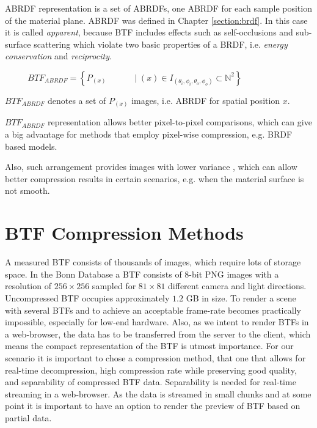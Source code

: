  ABRDF representation is a set of ABRDFs, one ABRDF for each sample position of the material plane. 
 ABRDF was defined in Chapter \ref{section:brdf}. In this case it is called \emph{apparent}, 
 because BTF includes effects such as self-occlusions and sub-surface scattering which violate two basic properties of a BRDF, i.e. \emph{energy conservation} and \emph{reciprocity}.
 
 {\centering $\,\,\,\,\,\,\,\,\,\,\,\,\,\,\,\,BTF_{ABRDF}=\left \{P_{(x) } \,\,\,\,\,\,\,\,\,\,\,\,\,\,\,\,\,\,\mid  (x)\in I_{(\theta_{i} ,\phi_{i},\theta_{o} ,\phi_{o})}\subset \mathbb{N}^{2}\right \}$ \\}
 
 $BTF_{ABRDF}$ denotes a set of $P_{(x)}$ images, i.e. ABRDF for spatial position $x$.


 $BTF_{ABRDF}$ representation allows better pixel-to-pixel comparisons, which can give a big advantage for methods that employ pixel-wise compression, e.g. BRDF based models.

Also, such arrangement provides images with lower variance \cite{haindl}, which can allow better compression results in certain scenarios, e.g. when the material surface is not smooth.

 
\section{BTF Compression Methods}
\label{chapter:compression_methods}



 A measured BTF consists of thousands of images, which require lots of storage space.
In the Bonn  Database \cite{btfBonn} a BTF consists of 8-bit PNG images with a resolution of $256\times256$ sampled for $81\times81$ different camera and light directions.
  Uncompressed BTF occupies approximately $1.2$ GB in size.
 To render a scene with several BTFs and to achieve an acceptable frame-rate becomes practically impossible, especially for low-end hardware.
 Also, as we intent to render BTFs in a web-browser, the data has to be transferred from the server to the client, which means the compact representation of the BTF is utmost importance.
 For our scenario it is important to chose a compression method, that one that allows for real-time decompression, high compression rate while preserving good quality, and separability of compressed BTF data.
 Separability is needed for real-time streaming in a web-browser.  
 As the data is streamed in small chunks and at some point it is important to have an option to render the preview of BTF based on partial data.

